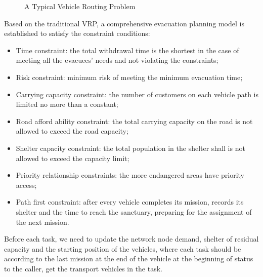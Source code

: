 \documentclass{mcmthesis}
\begin{document}
\begin{figure}[!htbp]
  \caption{A Typical Vehicle Routing Problem}\label{Figure3}
\end{figure}

Based on the traditional VRP, a comprehensive evacuation planning model is established to satisfy the constraint conditions:
\begin{itemize}
  \item Time constraint: the total withdrawal time is the shortest in the case of meeting all the evacuees' needs and not violating the constraints;
  \item Risk constraint: minimum risk of meeting the minimum evacuation time;
  \item Carrying capacity constraint: the number of customers on each vehicle path is limited no more than a constant;
  \item Road afford ability constraint: the total carrying capacity on the road is not allowed to exceed the road capacity;
  \item Shelter capacity constraint: the total population in the shelter shall is not allowed to exceed the capacity limit;
  \item Priority relationship constraints: the more endangered areas have priority access;
  \item Path first constraint: after every vehicle completes its mission, records its shelter and the time to reach the sanctuary, preparing for the assignment of the next mission.
\end{itemize}

Before each task, we need to update the network node demand, shelter of residual capacity and the starting position of the vehicles, where each task should be according to the last mission at the end of the vehicle at the beginning of status to the caller, get the transport vehicles in the task.
\end{document}

